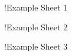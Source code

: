 \begin{structure}
    \subpage!{Example Sheet 1}
   
    \subpage!{Example Sheet 2}

    \subpage!{Example Sheet 3}
\end{structure}